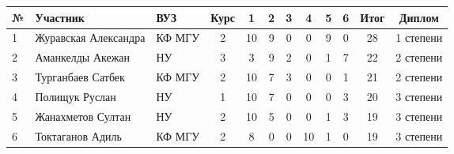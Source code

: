 \begin{center}
\begin{tabular}{|l|l|l|c|c|c|c|c|c|c|c|c|}
\hline
№ & Участник & ВУЗ & Курс & 1 & 2 & 3 & 4 & 5 & 6 & Итог & Диплом \\
\hline
1 & Журавская Александра & КФ МГУ & 2 & 10 & 9 & 0 & 0 & 9 & 0 & 28 & 1 степени \\
\hline
2 & Аманкелды Акежан & НУ & 3 & 3 & 9 & 2 & 0 & 1 & 7 & 22 & 2 степени \\
\hline
3 & Турганбаев Сатбек & КФ МГУ & 2 & 10 & 7 & 3 & 0 & 0 & 1 & 21 & 2 степени \\
\hline
4 & Полищук Руслан & НУ & 1 & 10 & 7 & 0 & 0 & 0 & 3 & 20 & 3 степени \\
\hline
5 & Жанахметов Султан & НУ & 2 & 10 & 5 & 0 & 0 & 1 & 3 & 19 & 3 степени \\
\hline
6 & Токтаганов Адиль & КФ МГУ & 2 & 8 & 0 & 0 & 10 & 1 & 0 & 19 & 3 степени \\
\hline
\end{tabular}
\end{center}